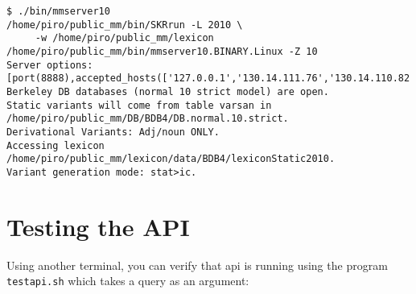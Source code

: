 \documentclass[11pt]{article}
\begin{document}
\begin{verbatim}
$ ./bin/mmserver10
/home/piro/public_mm/bin/SKRrun -L 2010 \
     -w /home/piro/public_mm/lexicon /home/piro/public_mm/bin/mmserver10.BINARY.Linux -Z 10
Server options: [port(8888),accepted_hosts(['127.0.0.1','130.14.111.76','130.14.110.82'])]
Berkeley DB databases (normal 10 strict model) are open.
Static variants will come from table varsan in /home/piro/public_mm/DB/BDB4/DB.normal.10.strict.
Derivational Variants: Adj/noun ONLY.
Accessing lexicon /home/piro/public_mm/lexicon/data/BDB4/lexiconStatic2010.
Variant generation mode: stat>ic.
\end{verbatim}



\section{Testing the API}
\label{Testing the API}

Using another terminal, you can verify that api is running using the
program \texttt{testapi.sh} which takes a query as an argument:
\end{document}
